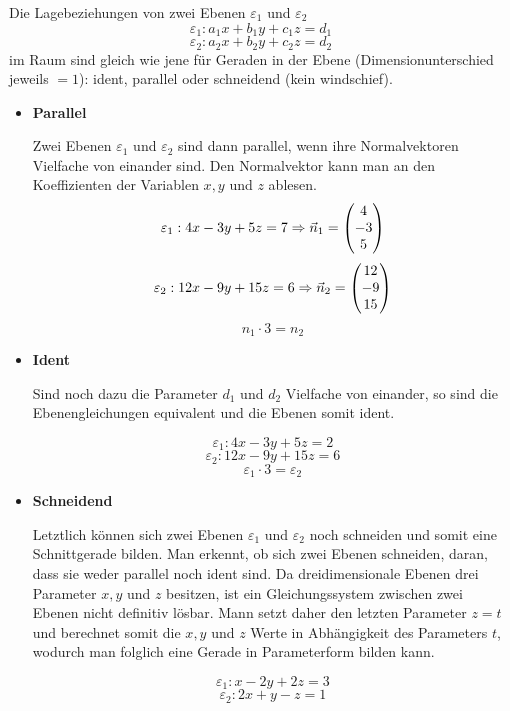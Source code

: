 \pagebreak


Die Lagebeziehungen von zwei Ebenen $\varepsilon_{1}$ und $\varepsilon_{2}$ $$\varepsilon_{1}: a_{1}x + b_{1}y + c_{1}z = d_{1}$$ $$\varepsilon_{2}: a_{2}x + b_{2}y + c_{2}z = d_{2}$$ im Raum sind gleich wie jene f\"{u}r Geraden in der Ebene (Dimensionunterschied jeweils $= 1$): ident, parallel oder schneidend (kein windschief).

\begin{itemize}

  \item{\textbf{Parallel}}

  Zwei Ebenen $\varepsilon_{1}$ und $\varepsilon_{2}$ sind dann parallel, wenn ihre Normalvektoren Vielfache von einander sind. Den Normalvektor kann man an den Koeffizienten der Variablen $x, y$ und $z$ ablesen.
  $$\varepsilon_{1}: 4x - 3y + 5z = 7 \Rightarrow \vec{n}_{1} = \begin{pmatrix}4 \\ -3 \\ 5\end{pmatrix}$$
  $$\varepsilon_{2}: 12x -9y + 15z = 6 \Rightarrow \vec{n}_{2} = \begin{pmatrix}12 \\ -9 \\ 15\end{pmatrix}$$
  $$n_{1} \cdot 3 = n_{2}$$

  \item{\textbf{Ident}}

  Sind noch dazu die Parameter $d_{1}$ und $d_{2}$ Vielfache von einander, so sind die Ebenengleichungen equivalent und die Ebenen somit ident.

  $$\varepsilon_{1}: 4x - 3y + 5z = 2$$
  $$\varepsilon_{2}: 12x -9y + 15z = 6$$
  $$\varepsilon_{1} \cdot 3 = \varepsilon_{2}$$

  \item{\textbf{Schneidend}}

  Letztlich k\"{o}nnen sich zwei Ebenen $\varepsilon_{1}$ und $\varepsilon_{2}$ noch schneiden und somit eine Schnittgerade bilden. Man erkennt, ob sich zwei Ebenen schneiden, daran, dass sie weder parallel noch ident sind. Da dreidimensionale Ebenen drei Parameter $x, y$ und $z$ besitzen, ist ein Gleichungssystem zwischen zwei Ebenen nicht definitiv l\"{o}sbar. Mann setzt daher den letzten Parameter $z = t$ und berechnet somit die $x, y$ und $z$ Werte in Abh\"{a}ngigkeit des Parameters $t$, wodurch man folglich eine Gerade in Parameterform bilden kann.

  $$\varepsilon_{1}: x - 2y + 2z = 3$$ $$\varepsilon_{2}: 2x + y - z = 1$$


\end{itemize}
